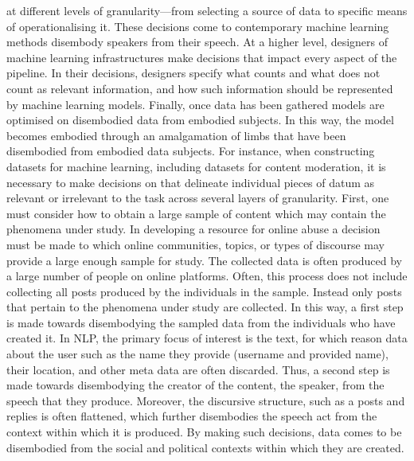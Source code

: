 { at different levels of granularity---from selecting a source of data to specific means of operationalising it.
These decisions come to  contemporary machine learning methods disembody  speakers from their speech.
At a higher level, designers of machine learning infrastructures make decisions that impact every aspect of the pipeline.
In their decisions, designers specify what counts and what does not count as relevant information, and how such information should be represented by machine learning models.
Finally, once data has been gathered models are optimised on disembodied data from embodied subjects.
In this way, the model becomes embodied through an amalgamation of limbs that have been disembodied from embodied data subjects.
For instance, when constructing datasets for machine learning, including datasets for content moderation, it is necessary to make decisions on that delineate individual pieces of datum as relevant or irrelevant to the task across several layers of granularity.
First, one must consider how to obtain a large sample of content which may contain the phenomena under study.
In developing a resource for online abuse a decision must be made to which online communities, topics, or types of discourse may provide a large enough sample for study.
The collected data is often produced by a large number of people on online platforms.
Often, this process does not include collecting all posts produced by the individuals in the sample.
Instead only posts that pertain to the phenomena under study are collected.
In this way, a first step is made towards disembodying the sampled data from the individuals who have created it.
In NLP, the primary focus of interest is the text, for which reason data about the user such as the name they provide (username and provided name), their location, and other meta data are often discarded.
Thus, a second step is made towards disembodying the creator of the content, the speaker, from the speech that they produce.
Moreover, the discursive structure, such as a posts and replies is often flattened, which further disembodies the speech act from the context within which it is produced.
By making such decisions, data comes to be disembodied from the social and political contexts within which they are created.

}
